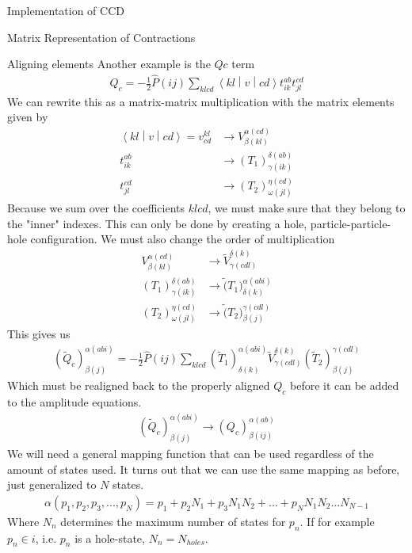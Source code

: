 \documentclass[twoside,english]{uiofysmaster}
\begin{document}
\begin{chapter}{Implementation of CCD}
\begin{section}{Matrix Representation of Contractions}
\begin{subsection}{Aligning elements}
			Another example is the $Qc$ term
			\begin{align}
				Q_c = -\frac{1}{2} \hat P(ij) \sum_{klcd} \left< kl \middle| v \middle| cd \right> t_{ik}^{ab} t_{jl}^{cd} 
			\end{align}
			We can rewrite this as a matrix-matrix multiplication with the matrix elements given by
			\begin{align}
				\left< kl \middle| v \middle| cd \right> = v_{cd}^{kl} & \rightarrow V^{\alpha(cd)}_{\beta(kl)} \\
				t_{ik}^{ab} & \rightarrow (T_1)_{\gamma(ik)}^{\delta(ab)} \\
				t_{jl}^{cd} & \rightarrow (T_2)_{\omega(jl)}^{\eta(cd)}
			\end{align}
			Because we sum over the coefficients $klcd$, we must make sure that they belong to the "inner" indexes. This can only be done by creating a hole, particle-particle-hole configuration. We must also change the order of multiplication
			\begin{align}
				V^{\alpha(cd)}_{\beta(kl)} &  \rightarrow \tilde V^{\delta(k)}_{\gamma(cdl)} \\
				(T_1)_{\gamma(ik)}^{\delta(ab)} & \rightarrow \tilde (T_1)^{\alpha(abi)}_{\delta(k)} \\
				(T_2)_{\omega(jl)}^{\eta(cd)} & \rightarrow \tilde (T_2)^{\gamma(cdl)}_{\beta(j)}
			\end{align}
			This gives us
			\begin{align}
				( \tilde Q_c )_{\beta(j)}^{\alpha(abi)} = -\frac{1}{2} \hat P(ij) \sum_{klcd} (\tilde T_1)^{\alpha(abi)}_{\delta(k)} \tilde V^{\delta(k)}_{\gamma(cdl)} (\tilde T_2)^{\gamma(cdl)}_{\beta(j)}
			\end{align}
			Which must be realigned back to the properly aligned $Q_c$ before it can be added to the amplitude equations.
			\begin{align}
				( \tilde Q_c )_{\beta(j)}^{\alpha(abi)} \rightarrow (Q_c)_{\beta(ij)}^{\alpha(ab)}
			\end{align}
			We will need a general mapping function that can be used regardless of the amount of states used. It turns out that we can use the same mapping as before, just generalized to $N$ states.
			\begin{align}
				\alpha(p_1,p_2,p_3,...,p_N) = p_1 + p_2N_1 + p_3N_1N_2 + ... + p_N N_1 N_2 ... N_{N-1} 
			\end{align}
			Where $N_n$ determines the maximum number of states for $p_n$. If for example $p_n \in i$, i.e. $p_n$ is a hole-state, $N_n = N_{holes}$.


\end{subsection}
\end{section}
\end{chapter}
\end{document}
